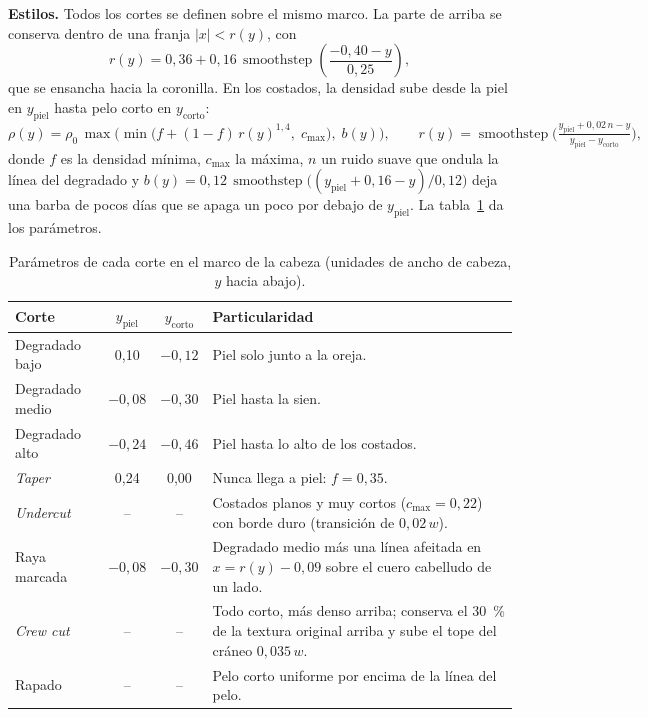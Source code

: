 \textbf{Estilos.} Todos los cortes se definen sobre el mismo marco. La parte de arriba se conserva dentro de una franja $|x|<r(y)$, con
\begin{equation}
  r(y)=0{,}36+0{,}16\,\operatorname{smoothstep}\!\left(\frac{-0{,}40-y}{0{,}25}\right),
\end{equation}
que se ensancha hacia la coronilla. En los costados, la densidad sube desde la piel en $y_{\text{piel}}$ hasta pelo corto en $y_{\text{corto}}$:
\begin{equation}
  \rho(y)=\rho_0\,\max\!\Big(\min\!\big(f+(1-f)\,r(y)^{1{,}4},\;c_{\max}\big),\;b(y)\Big),\qquad r(y)=\operatorname{smoothstep}\!\Big(\tfrac{y_{\text{piel}}+0{,}02\,n-y}{y_{\text{piel}}-y_{\text{corto}}}\Big),
\end{equation}
donde $f$ es la densidad mínima, $c_{\max}$ la máxima, $n$ un ruido suave que ondula la línea del degradado y $b(y)=0{,}12\,\operatorname{smoothstep}\big((y_{\text{piel}}+0{,}16-y)/0{,}12\big)$ deja una barba de pocos días que se apaga un poco por debajo de $y_{\text{piel}}$. La tabla~\ref{tab:cortes} da los parámetros.

\begin{table}[ht]
\centering
\small
\begin{tabularx}{\linewidth}{@{}l c c X@{}}
\toprule
Corte & $y_{\text{piel}}$ & $y_{\text{corto}}$ & Particularidad \\
\midrule
Degradado bajo & 0{,}10 & $-0{,}12$ & Piel solo junto a la oreja. \\
Degradado medio & $-0{,}08$ & $-0{,}30$ & Piel hasta la sien. \\
Degradado alto & $-0{,}24$ & $-0{,}46$ & Piel hasta lo alto de los costados. \\
\emph{Taper} & 0{,}24 & 0{,}00 & Nunca llega a piel: $f=0{,}35$. \\
\emph{Undercut} & -- & -- & Costados planos y muy cortos ($c_{\max}=0{,}22$) con borde duro (transición de $0{,}02\,w$). \\
Raya marcada & $-0{,}08$ & $-0{,}30$ & Degradado medio más una línea afeitada en $x=r(y)-0{,}09$ sobre el cuero cabelludo de un lado. \\
\emph{Crew cut} & -- & -- & Todo corto, más denso arriba; conserva el 30~\% de la textura original arriba y sube el tope del cráneo $0{,}035\,w$. \\
Rapado & -- & -- & Pelo corto uniforme por encima de la línea del pelo. \\
\bottomrule
\end{tabularx}
\caption{Parámetros de cada corte en el marco de la cabeza (unidades de ancho de cabeza, $y$ hacia abajo).}
\label{tab:cortes}
\end{table}

